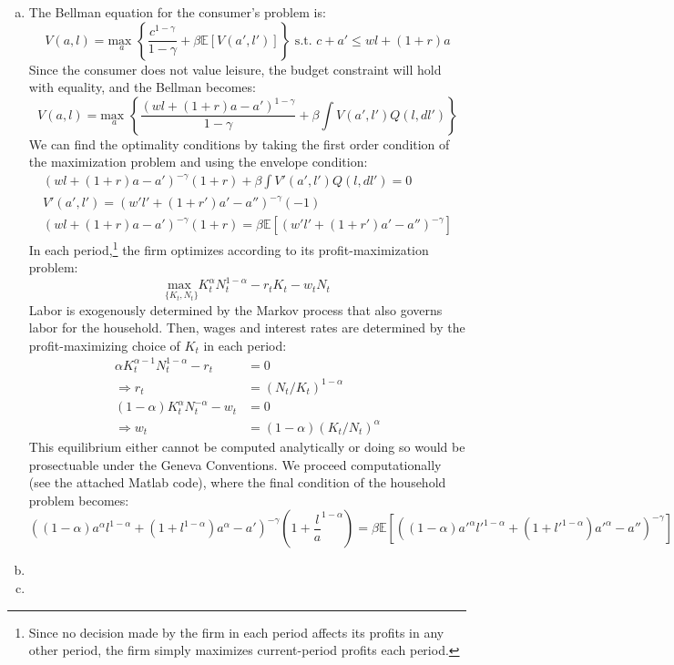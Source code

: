\documentclass{article}
\newcommand{\usmax}[1]{\underset{#1}{\text{max }}}
\newcommand{\E}[1]{\mathbb{E}\left[#1\right]} %
\begin{document}
\begin{enumerate}[(a)]
	\item The Bellman equation for the consumer's problem is:
		\[
			V(a,l) = \usmax{a}\left\{\frac{c^{1-\gamma}}{1-\gamma} + \beta\E{V(a',l')}\right\}\text{ s.t. } c + a' \leq wl + (1+r)a 
		\]
		Since the consumer does not value leisure, the budget constraint will hold with equality, and the Bellman becomes:
		\[
			V(a,l) = \usmax{a}\left\{\frac{(wl + (1+r)a - a')^{1-\gamma}}{1-\gamma} + \beta\int V(a',l')Q(l,dl')\right\}
		\]
		We can find the optimality conditions by taking the first order condition of the maximization problem and using the envelope condition:
		\begin{eqnarray*}
			\left(wl + (1+r)a - a'\right)^{-\gamma}(1+r) + \beta\int V'(a',l')Q(l,dl') = 0	\\
			V'(a',l') = \left(w'l' + (1+r')a' - a''\right)^{-\gamma}(-1)	\\
			\left(wl + (1+r)a - a'\right)^{-\gamma}(1+r) = \beta\E{\left(w'l' + (1+r')a' - a''\right)^{-\gamma}}
		\end{eqnarray*}
		In each period,\footnote{Since no decision made by the firm in each period affects its profits in any other period, the firm simply maximizes current-period profits each period.} the firm optimizes according to its profit-maximization problem:
		\[
			\usmax{\{K_t,N_t\}}K_t^\alpha N_t^{1-\alpha} - r_tK_t - w_tN_t
		\]
		Labor is exogenously determined by the Markov process that also governs labor for the household. Then, wages and interest rates are determined by the profit-maximizing choice of $K_t$ in each period:
		\begin{align*}
			\alpha K_t^{\alpha-1}N_t^{1-\alpha} - r_t &= 0	\\
			\Rightarrow r_t &= (N_t/K_t)^{1-\alpha}				\\
			(1-\alpha)K_t^\alpha N_t^{-\alpha} - w_t &= 0	\\
			\Rightarrow w_t &= (1-\alpha)(K_t/N_t)^\alpha
		\end{align*}
		This equilibrium either cannot be computed analytically or doing so would be prosectuable under the Geneva Conventions. We proceed computationally (see the attached Matlab code), where the final condition of the household problem becomes:
		{\tiny
		\[
			\left((1-\alpha)a^\alpha l^{1-\alpha} + (1+l^{1-\alpha})a^\alpha - a'\right)^{-\gamma}\left(1+\frac{l}{a}^{1-\alpha}\right) = 
			\beta\E{\left((1-\alpha)a'^\alpha l'^{1-\alpha} + (1+l'^{1-\alpha})a'^\alpha - a''\right)^{-\gamma}}
		\]
		}%
	
	\item 
	
	
	\item 
	
	
\end{enumerate}
\end{document}
